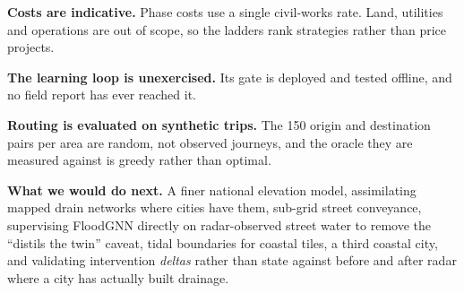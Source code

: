 \textbf{Costs are indicative.} Phase costs use a single civil-works rate. Land, utilities and
operations are out of scope, so the ladders rank strategies rather than price projects.

\textbf{The learning loop is unexercised.} Its gate is deployed and tested offline, and no field
report has ever reached it.

\textbf{Routing is evaluated on synthetic trips.} The 150 origin and destination pairs per area are
random, not observed journeys, and the oracle they are measured against is greedy rather than
optimal.

\textbf{What we would do next.} A finer national elevation model, assimilating mapped drain networks
where cities have them, sub-grid street conveyance, supervising FloodGNN directly on radar-observed
street water to remove the ``distils the twin'' caveat, tidal boundaries for coastal tiles, a third
coastal city, and validating intervention \emph{deltas} rather than state against before and after
radar where a city has actually built drainage.
